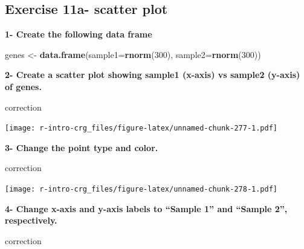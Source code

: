 \documentclass[]{book}
\newenvironment{Shaded}{\begin{snugshade}}{\end{snugshade}}
\newcommand{\DataTypeTok}[1]{\textcolor[rgb]{0.13,0.29,0.53}{#1}}
\newcommand{\DecValTok}[1]{\textcolor[rgb]{0.00,0.00,0.81}{#1}}
\newcommand{\KeywordTok}[1]{\textcolor[rgb]{0.13,0.29,0.53}{\textbf{#1}}}
\newcommand{\NormalTok}[1]{#1}
\newcommand{\OperatorTok}[1]{\textcolor[rgb]{0.81,0.36,0.00}{\textbf{#1}}}
\newcommand{\StringTok}[1]{\textcolor[rgb]{0.31,0.60,0.02}{#1}}
\begin{document}
\hypertarget{exercise-11a--scatter-plot}{%
\subsection{Exercise 11a- scatter plot}\label{exercise-11a--scatter-plot}}

\textbf{1- Create the following data frame}

\begin{Shaded}
\begin{Highlighting}[]
\NormalTok{genes <-}\StringTok{ }\KeywordTok{data.frame}\NormalTok{(}\DataTypeTok{sample1=}\KeywordTok{rnorm}\NormalTok{(}\DecValTok{300}\NormalTok{),}
                    \DataTypeTok{sample2=}\KeywordTok{rnorm}\NormalTok{(}\DecValTok{300}\NormalTok{))}
\end{Highlighting}
\end{Shaded}

\textbf{2- Create a scatter plot showing sample1 (x-axis) vs sample2 (y-axis) of genes.}

correction

\begin{Shaded}
\end{Shaded}

\texttt{[image: r-intro-crg\_files/figure-latex/unnamed-chunk-277-1.pdf]}

\textbf{3- Change the point type and color.}

correction

\begin{Shaded}
\end{Shaded}

\texttt{[image: r-intro-crg\_files/figure-latex/unnamed-chunk-278-1.pdf]}

\textbf{4- Change x-axis and y-axis labels to ``Sample 1'' and ``Sample 2'', respectively.}

correction

\begin{Shaded}
\end{Shaded}
\end{document}
